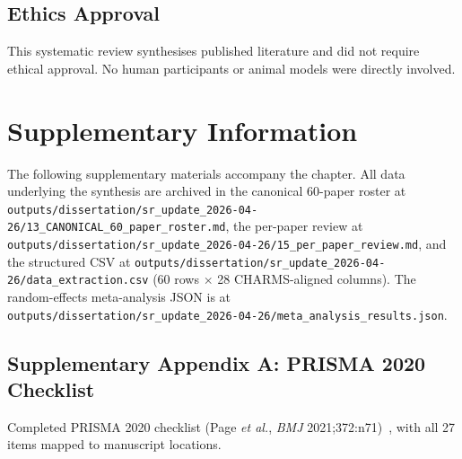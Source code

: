 \subsection*{Ethics Approval}
This systematic review synthesises published literature and did not require ethical approval. No human participants or animal models were directly involved.

\clearpage
\section*{Supplementary Information}
\label{sr:sec:supp}

\begingroup
\renewcommand{\thetable}{S\arabic{table}}
\renewcommand{\thefigure}{S\arabic{figure}}
\setcounter{table}{0}
\setcounter{figure}{0}

The following supplementary materials accompany the chapter. All data underlying the synthesis are archived in the canonical 60-paper roster at \texttt{outputs/dissertation/sr\_update\_2026-04-26/13\_CANONICAL\_60\_paper\_roster.md}, the per-paper review at \texttt{outputs/dissertation/sr\_update\_2026-04-26/15\_per\_paper\_review.md}, and the structured CSV at \texttt{outputs/dissertation/sr\_update\_2026-04-26/data\_extraction.csv} (60 rows $\times$ 28 CHARMS-aligned columns). The random-effects meta-analysis JSON is at \texttt{outputs/dissertation/sr\_update\_2026-04-26/meta\_analysis\_results.json}.

\subsection*{Supplementary Appendix A: PRISMA 2020 Checklist}
\label{sr:sec:supp:prisma}

\noindent Completed PRISMA 2020 checklist (Page \textit{et al.}, \textit{BMJ} 2021;372:n71)~\cite{page2021}, with all 27 items mapped to manuscript locations.

